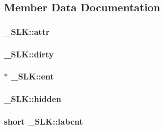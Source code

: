 \subsection{Member Data Documentation}
\hypertarget{struct___s_l_k_a3d2c6d41270edcd2650f8ab6a0515a50}{
\subsubsection[{attr}]{ \-\_\-\-S\-L\-K\-::attr}}\label{struct___s_l_k_a3d2c6d41270edcd2650f8ab6a0515a50}
\hypertarget{struct___s_l_k_ace7f1360b4c1d1304e7a4aa6df2150e9}{
\subsubsection[{dirty}]{ \-\_\-\-S\-L\-K\-::dirty}}\label{struct___s_l_k_ace7f1360b4c1d1304e7a4aa6df2150e9}
\hypertarget{struct___s_l_k_a5858a4d5b56a4989140f5ce69173b975}{
\subsubsection[{ent}]{$\ast$ \-\_\-\-S\-L\-K\-::ent}}\label{struct___s_l_k_a5858a4d5b56a4989140f5ce69173b975}
\hypertarget{struct___s_l_k_a17b05a989cd3d1c93d9ede62454e5aa0}{
\subsubsection[{hidden}]{ \-\_\-\-S\-L\-K\-::hidden}}\label{struct___s_l_k_a17b05a989cd3d1c93d9ede62454e5aa0}
\hypertarget{struct___s_l_k_ae8e80a48dcf542d50759059d4e0436e6}{
\subsubsection[{labcnt}]{\setlength{\rightskip}{0pt plus 5cm}short \-\_\-\-S\-L\-K\-::labcnt}}\label{struct___s_l_k_ae8e80a48dcf542d50759059d4e0436e6}
